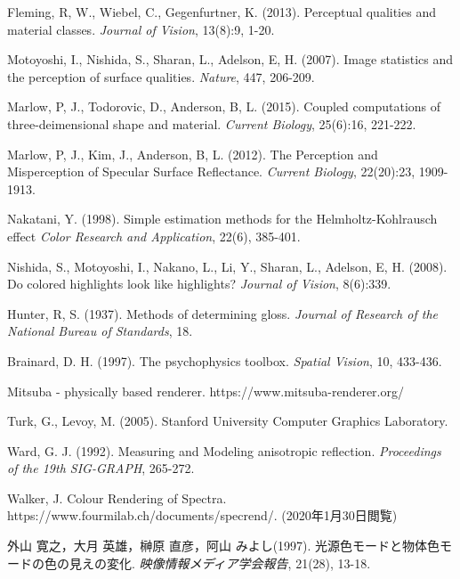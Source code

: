\begin{thebibliography}{99}%

    Fleming, R, W., Wiebel, C., Gegenfurtner, K. (2013).
    Perceptual qualities and material classes.
    {\it Journal of Vision}, 13(8):9, 1-20.

    Motoyoshi, I., Nishida, S., Sharan, L., Adelson, E, H. (2007).
    Image statistics and the perception of surface qualities.
    {\it Nature}, 447, 206-209.

    Marlow, P, J., Todorovic, D., Anderson, B, L. (2015).
    Coupled computations of three-deimensional shape and material.
    {\it Current Biology}, 25(6):16, 221-222.

    Marlow, P, J., Kim, J., Anderson, B, L. (2012).
    The Perception and Misperception of Specular Surface Reflectance.
    {\it Current Biology}, 22(20):23, 1909-1913.

    Nakatani, Y. (1998).
    Simple estimation methods for the Helmholtz-Kohlrausch effect
    {\it Color Research and Application}, 22(6), 385-401.

    Nishida, S., Motoyoshi, I., Nakano, L., Li, Y., Sharan, L., Adelson, E, H. (2008).
    Do colored highlights look like highlights?
    {\it Journal of Vision}, 8(6):339.

    Hunter, R, S. (1937).
    Methods of determining gloss.
    {\it Journal of Research of the National Bureau of Standards}, 18.

    Brainard, D. H. (1997).
    The psychophysics toolbox.
    {\it Spatial Vision}, 10, 433-436.

    Mitsuba - physically based renderer. https://www.mitsuba-renderer.org/

    Turk, G., Levoy, M. (2005).
    Stanford University Computer Graphics Laboratory.

    Ward, G. J. (1992).
    Measuring and Modeling anisotropic reflection.
    {\it Proceedings of the 19th SIG-GRAPH}, 265-272.

    Walker, J. Colour Rendering of Spectra. \\
    https://www.fourmilab.ch/documents/specrend/. (2020年1月30日閲覧)

    外山 寛之，大月 英雄，榊原 直彦，阿山 みよし(1997).
    光源色モードと物体色モードの色の見えの変化.
    {\it 映像情報メディア学会報告}, 21(28), 13-18.

\end{thebibliography}
